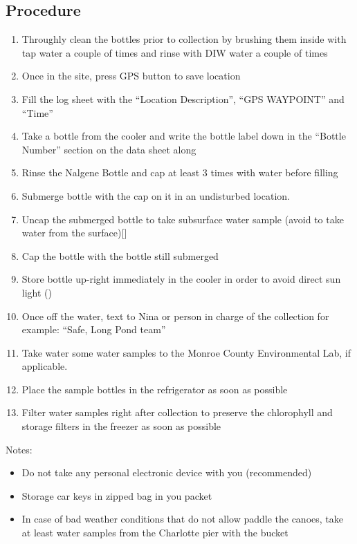 \documentclass[]{spie}  %
\begin{document}
\subsection{Procedure}
\begin{enumerate}
  \item Throughly clean the bottles prior to collection by brushing them inside with tap water a couple of times and rinse with DIW water a couple of times
  \item Once in the site, press GPS button to save location
  \item Fill the log sheet with the ``Location Description'', ``GPS WAYPOINT'' and ``Time''
  \item Take a bottle from the cooler and write the bottle label down in the ``Bottle Number'' section on the data sheet along
  \item Rinse the Nalgene Bottle and cap at least 3 times with water before filling
  \item Submerge bottle with the cap on it in an undisturbed location.
  \item Uncap the submerged bottle  to take subsurface water sample (avoid to take water from the surface)[\cite{Montana08}]
  \item Cap the bottle with the bottle still submerged
  \item Store bottle up-right immediately in the cooler in order to avoid direct sun light (\cite{Mueller1995})
  \item Once off the water, text to Nina or person in charge of the collection for example: ``Safe, Long Pond team''
  \item Take water some water samples to the Monroe County Environmental Lab, if applicable.
  \item Place the sample bottles in the refrigerator as soon as possible
  \item Filter water samples right after collection to preserve the chlorophyll and storage filters in the freezer as soon as possible
\end{enumerate}
Notes: 
\begin{itemize}
  \item Do not take any personal electronic device with you (recommended)
  \item Storage car keys in zipped bag in you packet
  \item In case of bad weather conditions that do not allow paddle the canoes, take at least water samples from the Charlotte pier with the bucket
\end{itemize}
\end{document}

